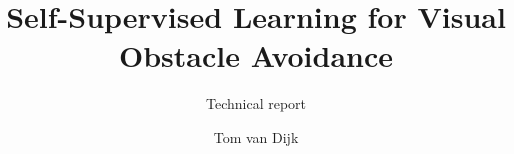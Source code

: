 \documentclass[whitelogo]{tudelft-report}
\begin{document}
\frontmatter


\title[tudelft-white]{Self-Supervised Learning for Visual Obstacle Avoidance}
\subtitle[tudelft-white]{Technical report}
\author[tudelft-white]{Tom van Dijk}
\makecover[whitelogo,frontboxwidth=\paperwidth-1.625in,frontboxheight=12cm,y=12cm+0.6in] %



%
%


\tableofcontents

\mainmatter







\appendix

%


\end{document}
